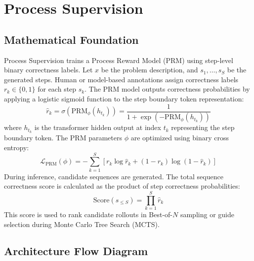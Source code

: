 \documentclass{article}
\begin{document}
\newpage
\section{Process Supervision}

\subsection{Mathematical Foundation}
Process Supervision trains a Process Reward Model (PRM) using step-level binary correctness labels. Let $x$ be the problem description, and $s_1, \dots, s_S$ be the generated steps. Human or model-based annotations assign correctness labels $r_k \in \{0, 1\}$ for each step $s_k$.
The PRM model outputs correctness probabilities by applying a logistic sigmoid function to the step boundary token representation:
\begin{equation}
  \hat{r}_k = \sigma\left( \text{PRM}_\phi(h_{t_k}) \right) = \frac{1}{1 + \exp\left( -\text{PRM}_\phi(h_{t_k}) \right)}
\end{equation}
where $h_{t_k}$ is the transformer hidden output at index $t_k$ representing the step boundary token. The PRM parameters $\phi$ are optimized using binary cross entropy:
\begin{equation}
  \mathcal{L}_{\text{PRM}}(\phi) = -\sum_{k=1}^S \left[ r_k \log \hat{r}_k + (1-r_k) \log(1 - \hat{r}_k) \right]
\end{equation}
During inference, candidate sequences are generated. The total sequence correctness score is calculated as the product of step correctness probabilities:
\begin{equation}
  \text{Score}(s_{\le S}) = \prod_{k=1}^S \hat{r}_k
\end{equation}
This score is used to rank candidate rollouts in Best-of-$N$ sampling or guide selection during Monte Carlo Tree Search (MCTS).

\subsection{Architecture Flow Diagram}
\end{document}
